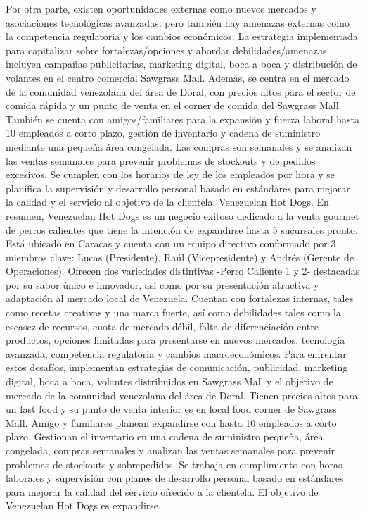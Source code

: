 Por otra parte, existen oportunidades externas como nuevos mercados y asociaciones tecnológicas avanzadas; pero también hay amenazas externas como la competencia regulatoria y los cambios económicos.
La estrategia implementada para capitalizar sobre fortalezas/opciones y abordar debilidades/amenazas incluyen campañas publicitarias, marketing digital, boca a boca y distribución de volantes en el centro comercial Sawgrass Mall. Además, se centra en el mercado de la comunidad venezolana del área de Doral, con precios altos para el sector de comida rápida y un punto de venta en el corner de comida del Sawgrass Mall. También se cuenta con amigos/familiares para la expansión y fuerza laboral hasta 10 empleados a corto plazo, gestión de inventario y cadena de suministro mediante una pequeña área congelada. Las compras son semanales y se analizan las ventas semanales para prevenir problemas de stockouts y de pedidos excesivos. Se cumplen con los horarios de ley de los empleados por hora y se planifica la supervisión y desarrollo personal basado en estándares para mejorar la calidad y el servicio al objetivo de la clientela: Venezuelan Hot Dogs.
En resumen, Venezuelan Hot Dogs es un negocio exitoso dedicado a la venta gourmet de perros calientes que tiene la intención de expandirse hasta 5 sucursales pronto. Está ubicado en Caracas y cuenta con un equipo directivo conformado por 3 miembros clave: Lucas (Presidente), Raúl (Vicepresidente) y Andrés (Gerente de Operaciones). Ofrecen dos variedades distintivas -Perro Caliente 1 y 2- destacadas por su sabor único e innovador, así como por su presentación atractiva y adaptación al mercado local de Venezuela. Cuentan con fortalezas internas, tales como recetas creativas y una marca fuerte, así como debilidades tales como la escasez de recursos, cuota de mercado débil, falta de diferenciación entre productos, opciones limitadas para presentarse en nuevos mercados, tecnología avanzada, competencia regulatoria y cambios macroeconómicos. Para enfrentar estos desafíos, implementan estrategias de comunicación, publicidad, marketing digital, boca a boca, volantes distribuidos en Sawgrass Mall y el objetivo de mercado de la comunidad venezolana del área de Doral. Tienen precios altos para un fast food y su punto de venta interior es en local food corner de Sawgrass Mall. Amigo y familiares planean expandirse con hasta 10 empleados a corto plazo. Gestionan el inventario en una cadena de suministro pequeña, área congelada, compras semanales y analizan las ventas semanales para prevenir problemas de stockouts y sobrepedidos. Se trabaja en cumplimiento con horas laborales y supervisión con planes de desarrollo personal basado en estándares para mejorar la calidad del servicio ofrecido a la clientela. El objetivo de Venezuelan Hot Dogs es expandirse.
